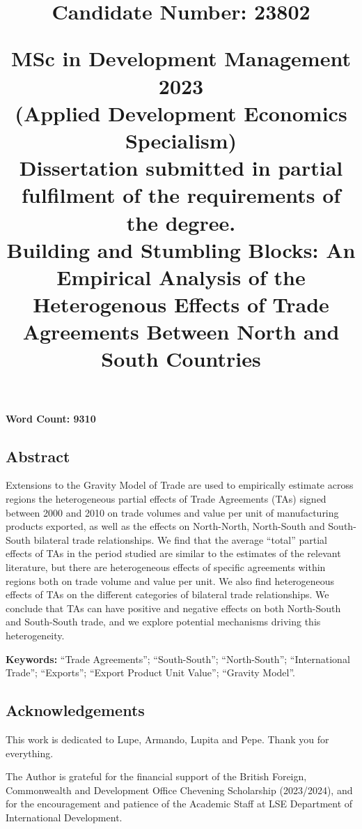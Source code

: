 \documentclass[12pt]{article}%
\title{
        \begin{flushright}
        \large \textbf{Candidate Number: 23802}
        \end{flushright}
        \vspace*{30mm}
        \begin{center}
        \large MSc in Development Management 2023 \\
        \large (Applied Development Economics Specialism) \\
        \vspace*{5mm}
        Dissertation submitted in partial fulfilment of the requirements of the degree. \\
        \vspace*{35mm}
        \large \textbf{Building and Stumbling Blocks: An Empirical Analysis of the Heterogenous Effects of Trade Agreements Between North and South Countries} \\
        \vspace*{20mm}
        \end{center}
    }%
\date{}%
\begin{document}
%
\normalsize%
%
\pagestyle{frontmatter}%
\maketitle%

\vfill
\begin{center}\textbf{Word Count: 9310}\end{center}
\newpage%
\vspace*{\fill}%
\begin{center}%
\begin{minipage}{0.8\textwidth}%
\begin{center}%
\section*{Abstract}%
\end{center}%
\justify%
Extensions to the Gravity Model of Trade are used to empirically estimate across regions the heterogeneous partial effects of Trade Agreements (TAs) signed between 2000 and 2010 on trade volumes and value per unit of manufacturing products exported, as well as the effects on North{-}North, North{-}South and South{-}South bilateral trade relationships. We find that the average “total” partial effects of TAs in the period studied are similar to the estimates of the relevant literature, but there are heterogeneous effects of specific agreements within regions both on trade volume and value per unit. We also find heterogeneous effects of TAs on the different categories of bilateral trade relationships. We conclude that TAs can have positive and negative effects on both North{-}South and South{-}South trade, and we explore potential mechanisms driving this heterogeneity.%
\end{minipage}%
\end{center}%
\vspace*{\fill}%
\vspace*{\fill}%
\begin{flushleft}%
\textbf{Keywords:} “Trade Agreements”; “South-South”; “North-South”; “International Trade”; “Exports”; “Export Product Unit Value”; “Gravity Model”.%
\end{flushleft}%
\newpage%
\newpage%
\begin{center}%
\section*{Acknowledgements}%
This work is dedicated to Lupe, Armando, Lupita and Pepe. Thank you for everything.%
\end{center}%
The Author is grateful for the financial support of the British Foreign, Commonwealth and Development Office Chevening Scholarship (2023/2024), and for the encouragement and patience of the Academic Staff at LSE Department of International Development.%
\newpage%
\tableofcontents%
\newpage%
\end{document}
